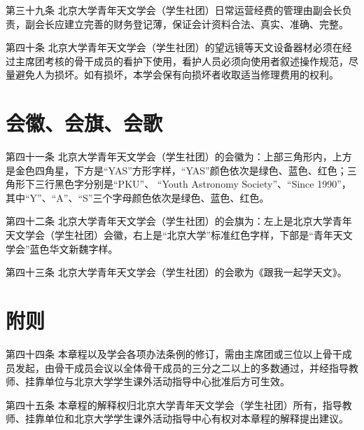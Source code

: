 第三十九条  北京大学青年天文学会（学生社团）日常运营经费的管理由副会长负责，副会长应建立完善的财务登记薄，保证会计资料合法、真实、准确、完整。

第四十条  北京大学青年天文学会（学生社团）的望远镜等天文设备器材必须在经过主席团考核的骨干成员的看护下使用，看护人员必须向使用者叙述操作规范，尽量避免人为损坏。如有损坏，本学会保有向损坏者收取适当修理费用的权利。

\section{会徽、会旗、会歌}

第四十一条  北京大学青年天文学会（学生社团）的会徽为：上部三角形内，上方是金色四角星，下方是“YAS”方形字样，“YAS”颜色依次是绿色、蓝色、红色；三角形下三行黑色字分别是“PKU”、 “Youth Astronomy Society”、“Since 1990”，其中“Y”、“A”、“S”三个字母颜色依次是绿色、蓝色、红色。

第四十二条  北京大学青年天文学会（学生社团）的会旗为：左上是北京大学青年天文学会（学生社团）会徽，右上是“北京大学”标准红色字样，下部是“青年天文学会”蓝色华文新魏字样。

第四十三条  北京大学青年天文学会（学生社团）的会歌为《跟我一起学天文》。

\section{附则}

第四十四条  本章程以及学会各项办法条例的修订，需由主席团或三位以上骨干成员发起，由骨干成员会议以全体骨干成员的三分之二以上的多数通过，并经指导教师、挂靠单位与北京大学学生课外活动指导中心批准后方可生效。

第四十五条  本章程的解释权归北京大学青年天文学会（学生社团）所有，指导教师、挂靠单位和北京大学学生课外活动指导中心有权对本章程的解释提出建议。
